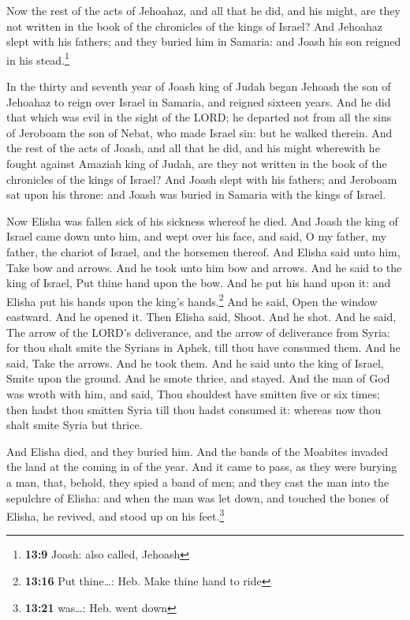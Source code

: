  Now the rest of the acts of Jehoahaz, and all that he
did, and his might, are they not written in the book of the chronicles
of the kings of Israel?  And Jehoahaz slept with his
fathers; and they buried him in Samaria: and Joash his son reigned in
his stead.\footnote{\textbf{13:9} Joash: also called, Jehoash}

 In the thirty and seventh year of Joash king of Judah
began Jehoash the son of Jehoahaz to reign over Israel in Samaria, and
reigned sixteen years.  And he did that which was evil in
the sight of the LORD; he departed not from all the sins of Jeroboam the
son of Nebat, who made Israel sin: but he walked therein.
 And the rest of the acts of Joash, and all that he did,
and his might wherewith he fought against Amaziah king of Judah, are
they not written in the book of the chronicles of the kings of Israel?
 And Joash slept with his fathers; and Jeroboam sat upon
his throne: and Joash was buried in Samaria with the kings of Israel.

 Now Elisha was fallen sick of his sickness whereof he
died. And Joash the king of Israel came down unto him, and wept over his
face, and said, O my father, my father, the chariot of Israel, and the
horsemen thereof.  And Elisha said unto him, Take bow and
arrows. And he took unto him bow and arrows.  And he said
to the king of Israel, Put thine hand upon the bow. And he put his hand
upon it: and Elisha put his hands upon the king's hands.\footnote{\textbf{13:16}
  Put thine\ldots: Heb. Make thine hand to ride}  And he
said, Open the window eastward. And he opened it. Then Elisha said,
Shoot. And he shot. And he said, The arrow of the LORD's deliverance,
and the arrow of deliverance from Syria: for thou shalt smite the
Syrians in Aphek, till thou have consumed them.  And he
said, Take the arrows. And he took them. And he said unto the king of
Israel, Smite upon the ground. And he smote thrice, and stayed.
 And the man of God was wroth with him, and said, Thou
shouldest have smitten five or six times; then hadst thou smitten Syria
till thou hadst consumed it: whereas now thou shalt smite Syria but
thrice.

 And Elisha died, and they buried him. And the bands of
the Moabites invaded the land at the coming in of the year.
 And it came to pass, as they were burying a man, that,
behold, they spied a band of men; and they cast the man into the
sepulchre of Elisha: and when the man was let down, and touched the
bones of Elisha, he revived, and stood up on his feet.\footnote{\textbf{13:21}
  was\ldots: Heb. went down}

